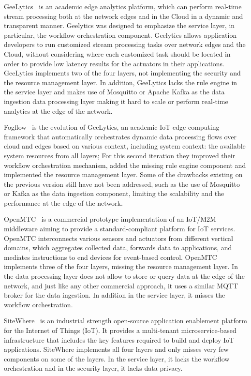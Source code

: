 GeeLytics~\cite{7389116} is an academic edge analytics platform, which can perform real-time stream processing both at the network edges and in the Cloud in a dynamic and transparent manner. Geelytics was designed to emphasize the service layer, in particular, the workflow orchestration component. Geelytics allows application developers to run customized stream processing tasks over network edges and the Cloud, without considering where each customized task should be located in order to provide low latency results for the actuators in their applications. GeeLytics implements two of the four layers, not implementing the security and the resource management layer. In addition, GeeLytics lacks the rule engine in the service layer and makes use of Mosquitto or Apache Kafka as the data ingestion data processing layer making it hard to scale or perform real-time analytics at the edge of the network.

Fogflow~\cite{8022859} is the evolution of GeeLytics, an academic IoT edge computing framework that automatically orchestrates dynamic data processing flows over cloud and edges based on various context, including system context: the available system resources from all layers; For this second iteration they improved their workflow orchestration mechanism, added the missing rule engine component and implemented the resource management layer. Some of the drawbacks existing on the previous version still have not been addressed, such as the use of Mosquitto or Kafka as the data ingestion component, limiting the scalability and the performance at the edge of the network.

OpenMTC~\cite{openMTC} is a commercial prototype implementation of an IoT/M2M middleware aiming to provide a standard-compliant platform for IoT services. OpenMTC interconnects various sensors and actuators from different vertical domains, which aggregates collected data, forwards data to applications, and mediates instructions to end devices for event-based control. OpenMTC implements three of the four layers, missing the resource management layer. In the data processing layer does not allow to store or query data at the edge of the network, and just like any other commercial approach, it uses a similar MQTT broker for the data ingestion. In addition in the service layer, it misses the workflow orchestration. 

SiteWhere~\cite{SiteWhere} is an industrial strength open-source application enablement platform for the Internet of Things (IoT). It provides a multi-tenant microservice-based infrastructure that includes the key features required to build and deploy IoT applications. SiteWhere implements all four layers and only misses very few components on some of the layers. In the service layer, it lacks the workflow orchestration and in the security layer, it lacks data privacy.

